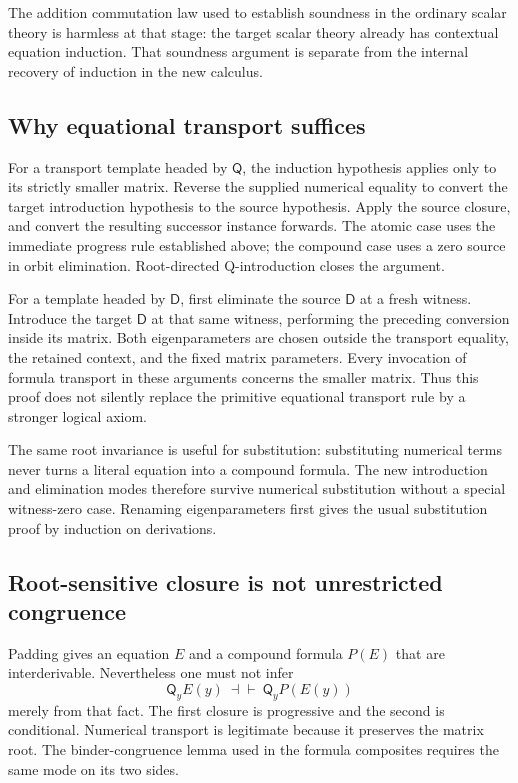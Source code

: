\documentclass[11pt,a4paper]{article}
\theoremstyle{definition}
\begin{document}
The addition commutation law used to establish soundness in the ordinary
scalar theory is harmless at that stage: the target scalar theory already
has contextual equation induction.  That soundness argument is separate
from the internal recovery of induction in the new calculus.

\subsection{Why equational transport suffices}

For a transport template headed by $\mathsf Q$, the induction hypothesis
applies only to its strictly smaller matrix.  Reverse the supplied
numerical equality to convert the target introduction hypothesis to the
source hypothesis.  Apply the source closure, and convert the resulting
successor instance forwards.  The atomic case uses the immediate progress
rule established above; the compound case uses a zero source in orbit
elimination.  Root-directed Q-introduction closes the argument.

For a template headed by $\mathsf D$, first eliminate the source
$\mathsf D$ at a fresh witness.  Introduce the target $\mathsf D$ at that
same witness, performing the preceding conversion inside its matrix.
Both eigenparameters are chosen outside the transport equality, the
retained context, and the fixed matrix parameters.  Every invocation of
formula transport in these arguments concerns the smaller matrix.
Thus this proof does not silently replace the primitive equational
transport rule by a stronger logical axiom.

The same root invariance is useful for substitution: substituting numerical
terms never turns a literal equation into a compound formula.  The new
introduction and elimination modes therefore survive numerical substitution
without a special witness-zero case.  Renaming eigenparameters first gives
the usual substitution proof by induction on derivations.

\subsection{Root-sensitive closure is not unrestricted congruence}

Padding gives an equation $E$ and a compound formula $P(E)$ that are
interderivable.  Nevertheless one must not infer
\[
               \mathsf Q_yE(y)\ \dashv\vdash\ 
               \mathsf Q_yP(E(y))
\]
merely from that fact.  The first closure is progressive and the second
is conditional.  Numerical transport is legitimate because it preserves
the matrix root.  The binder-congruence lemma used in the formula
composites requires the same mode on its two sides.
\end{document}
